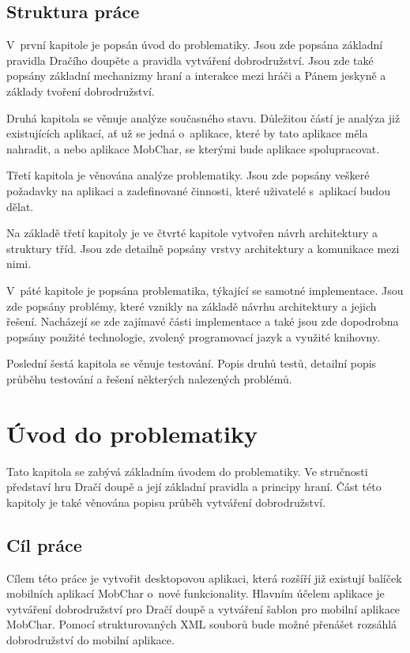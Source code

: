 \documentclass[thesis=B,czech]{resources/FITthesis}[2012/06/26]
\begin{document}
\begin{introduction}
\section*{Struktura práce}
V~první kapitole je popsán úvod do problematiky. Jsou zde popsána základní pravidla Dračího doupěte a pravidla vytváření dobrodružství. Jsou zde také popsány základní mechanizmy hraní a interakce mezi hráči a Pánem jeskyně a základy tvoření dobrodružství. \par

Druhá kapitola se věnuje analýze současného stavu. Důležitou částí je analýza již existujících aplikací, ať už se jedná o~aplikace, které by tato aplikace měla nahradit, a nebo aplikace MobChar, se kterými bude aplikace spolupracovat. \par

Třetí kapitola je věnována analýze problematiky. Jsou zde popsány veškeré požadavky na aplikaci a zadefinované činnosti, které uživatelé s~aplikací budou dělat. \par

Na základě třetí kapitoly je ve čtvrté kapitole vytvořen návrh architektury a struktury tříd. Jsou zde detailně popsány vrstvy architektury a komunikace mezi nimi. \par

V~páté kapitole je popsána problematika, týkající se samotné implementace. Jsou zde popsány problémy, které vznikly na základě návrhu architektury a jejich řešení. Nacházejí se zde zajímavé části implementace a také jsou zde dopodrobna popsány použité technologie, zvolený programovací jazyk a využité knihovny. \par

Poslední šestá kapitola se věnuje testování. Popis druhů testů, detailní popis průběhu testování a řešení některých nalezených problémů.


\end{introduction}

\chapter{Úvod do problematiky}
Tato kapitola se zabývá základním úvodem do problematiky. Ve stručnosti představí hru Dračí doupě a její základní pravidla a principy hraní. Část této kapitoly je také věnována popisu průběh vytváření dobrodružství.
	\section{Cíl práce}
Cílem této práce je vytvořit desktopovou aplikaci, která rozšíří již existují balíček mobilních aplikací MobChar o~nové funkcionality. Hlavním účelem aplikace je vytváření dobrodružství pro Dračí doupě a vytváření šablon pro mobilní aplikace MobChar. Pomocí strukturovaných XML souborů bude možné přenášet rozsáhlá dobrodružství do mobilní aplikace. \par
\end{document}
